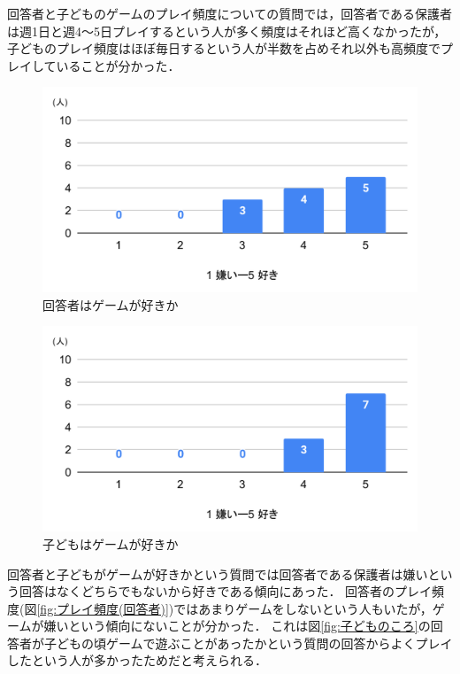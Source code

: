 \documentclass[12pt,a4j,titlepage]{ltjsarticle}
\begin{document}
回答者と子どものゲームのプレイ頻度についての質問では，回答者である保護者は週1日と週4～5日プレイするという人が多く頻度はそれほど高くなかったが，子どものプレイ頻度はほぼ毎日するという人が半数を占めそれ以外も高頻度でプレイしていることが分かった．

\begin{figure}[H]
 \begin{center}
  \includegraphics[keepaspectratio, scale=0.5]{chart4.pdf}
 \end{center}
 \caption{回答者はゲームが好きか}
 \label{fig:好き嫌い(回答者)}
\end{figure}

\begin{figure}[H]
 \begin{center}
  \includegraphics[keepaspectratio, scale=0.5]{chart5.pdf}
 \end{center}
 \caption{子どもはゲームが好きか}
 \label{fig:好き嫌い(子ども)}
\end{figure}

回答者と子どもがゲームが好きかという質問では回答者である保護者は嫌いという回答はなくどちらでもないから好きである傾向にあった．
回答者のプレイ頻度(図\ref{fig:プレイ頻度(回答者)})ではあまりゲームをしないという人もいたが，ゲームが嫌いという傾向にないことが分かった．
これは図\ref{fig:子どものころ}の回答者が子どもの頃ゲームで遊ぶことがあったかという質問の回答からよくプレイしたという人が多かったためだと考えられる．
\end{document}
